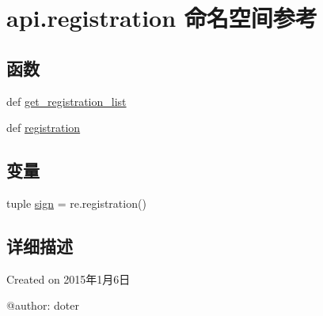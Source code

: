\hypertarget{namespaceapi_1_1registration}{\section{api.\-registration 命名空间参考}
\label{namespaceapi_1_1registration}
}
\subsection*{函数}
\begin{DoxyCompactItemize}
\item 
def \hyperlink{namespaceapi_1_1registration_a15e0ab9c75fc04338c52ecb9b27c7a6c}{get\-\_\-registration\-\_\-list}
\item 
def \hyperlink{namespaceapi_1_1registration_a33893e160be116487465db36b0d9014e}{registration}
\end{DoxyCompactItemize}
\subsection*{变量}
\begin{DoxyCompactItemize}
\item 
tuple \hyperlink{namespaceapi_1_1registration_a7e7c858355031d02054c96e7b53b24c5}{sign} = re.\-registration()
\end{DoxyCompactItemize}


\subsection{详细描述}
\begin{DoxyVerb}Created on 2015年1月6日

@author: doter
\end{DoxyVerb}
 

